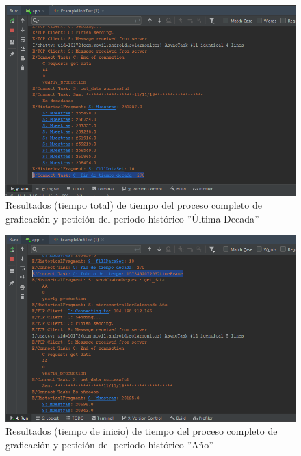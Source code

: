 \begin{figure}[H]
	\centering
	\includegraphics[scale=.6]{Capitulo5/images/TiempoCompletoUltimaDecada2.png}
	\caption{Resultados (tiempo total) de tiempo del proceso completo de graficación y petición del periodo histórico ''Última Decada''}	\label{fig:TiempoCompletoHUltimaDecada}
\end{figure} 
\begin{figure}[H]
	\centering
	\includegraphics[scale=.6]{Capitulo5/images/TiempoCompletoAno.png}
	\caption{Resultados (tiempo de inicio) de tiempo del proceso completo de graficación y petición del periodo histórico ''Año''}	\label{fig:TiempoCompletoHAno}
\end{figure} 
